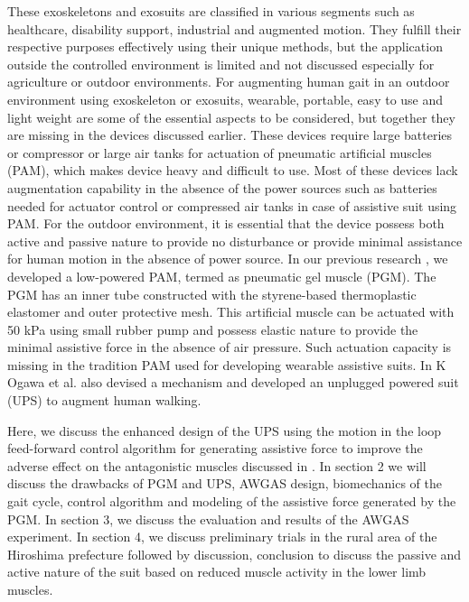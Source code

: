 \documentclass[paper,JRM,paper]{jaciiiarticle}
\begin{document}
These exoskeletons and exosuits are classified in various segments such as healthcare, disability support, industrial and augmented motion. They fulfill their respective purposes effectively using their unique methods, but the application outside the controlled environment is limited and not discussed especially for agriculture or outdoor environments. For augmenting human gait in an outdoor environment using exoskeleton or exosuits, wearable, portable, easy to use and light weight are some of the essential aspects to be considered, but together they are missing in the devices discussed earlier. These devices require large batteries or compressor or large air tanks for actuation of pneumatic artificial muscles (PAM), which makes device heavy and difficult to use. Most of these devices lack augmentation capability in the absence of the power sources such as batteries needed for actuator control or compressed air tanks in case of assistive suit using PAM. For the outdoor environment, it is essential that the device possess both active and passive nature to provide no disturbance or provide minimal assistance for human motion in the absence of power source. In our previous research \cite{13}, we developed a low-powered PAM, termed as pneumatic gel muscle (PGM). The PGM has an inner tube constructed with the styrene-based thermoplastic elastomer and outer protective mesh. This artificial muscle can be actuated with 50 kPa using small rubber pump and possess elastic nature to provide the minimal assistive force in the absence of air pressure. Such actuation capacity is missing in the tradition PAM used for developing wearable assistive suits. In \cite{13} K Ogawa et al. also devised a mechanism and developed an unplugged powered suit (UPS) to augment human walking.

Here, we discuss the enhanced design of the UPS using the motion in the loop feed-forward control algorithm for generating assistive force to improve the adverse effect on the antagonistic muscles discussed in \cite{13}. In section 2 we will discuss the drawbacks of PGM and UPS, AWGAS design, biomechanics of the gait cycle, control algorithm and modeling of the assistive force generated by the PGM. In section 3, we discuss the evaluation and results of the AWGAS experiment. In section 4, we discuss preliminary trials in the rural area of the Hiroshima prefecture followed by discussion, conclusion to discuss the passive and active nature of the suit based on reduced muscle activity in the lower limb muscles.
\end{document}
